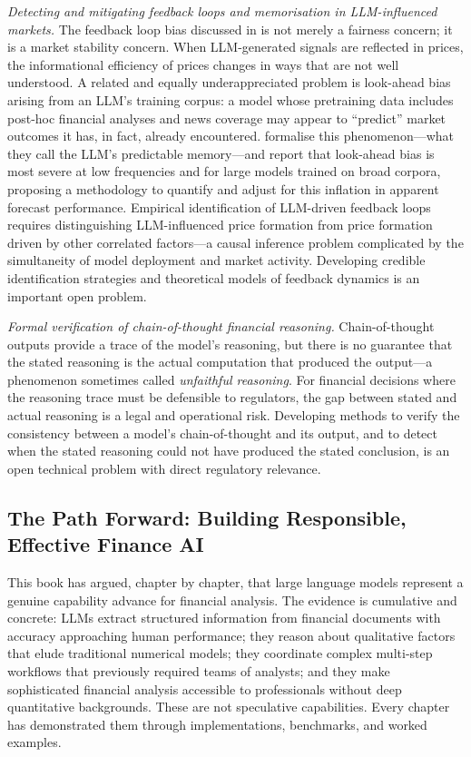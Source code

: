 \begin{context}
\emph{Detecting and mitigating feedback loops and memorisation in LLM-influenced markets.} The feedback loop bias discussed in  is not merely a fairness concern; it is a market stability concern. When LLM-generated signals are reflected in prices, the informational efficiency of prices changes in ways that are not well understood. A related and equally underappreciated problem is look-ahead bias arising from an LLM's training corpus: a model whose pretraining data includes post-hoc financial analyses and news coverage may appear to ``predict'' market outcomes it has, in fact, already encountered. \citet{didisheim2025memory} formalise this phenomenon---what they call the LLM's predictable memory---and report that look-ahead bias is most severe at low frequencies and for large models trained on broad corpora, proposing a methodology to quantify and adjust for this inflation in apparent forecast performance. Empirical identification of LLM-driven feedback loops requires distinguishing LLM-influenced price formation from price formation driven by other correlated factors---a causal inference problem complicated by the simultaneity of model deployment and market activity. Developing credible identification strategies and theoretical models of feedback dynamics is an important open problem.

\emph{Formal verification of chain-of-thought financial reasoning.} Chain-of-thought outputs provide a trace of the model's reasoning, but there is no guarantee that the stated reasoning is the actual computation that produced the output---a phenomenon sometimes called \emph{unfaithful reasoning}. For financial decisions where the reasoning trace must be defensible to regulators, the gap between stated and actual reasoning is a legal and operational risk. Developing methods to verify the consistency between a model's chain-of-thought and its output, and to detect when the stated reasoning could not have produced the stated conclusion, is an open technical problem with direct regulatory relevance.

\subsection{The Path Forward: Building Responsible, Effective Finance AI}
\label{subsec:af-future-path}

This book has argued, chapter by chapter, that large language models represent a genuine capability advance for financial analysis. The evidence is cumulative and concrete: LLMs extract structured information from financial documents with accuracy approaching human performance; they reason about qualitative factors that elude traditional numerical models; they coordinate complex multi-step workflows that previously required teams of analysts; and they make sophisticated financial analysis accessible to professionals without deep quantitative backgrounds. These are not speculative capabilities. Every chapter has demonstrated them through implementations, benchmarks, and worked examples.


\end{context}
